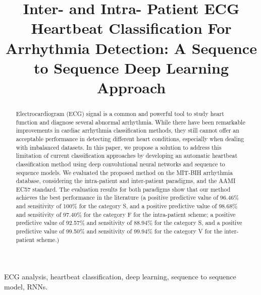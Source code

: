 \documentclass{article}
\title{Inter- and Intra- Patient ECG Heartbeat Classification For Arrhythmia Detection: A Sequence to Sequence Deep Learning Approach}
\begin{document}
\maketitle


\begin{abstract} 
Electrocardiogram (ECG) signal is a common and powerful tool to study heart function and diagnose several abnormal arrhythmia. While there have been remarkable improvements in cardiac arrhythmia classification methods,  they still cannot offer an acceptable performance in detecting different heart conditions, especially when dealing with imbalanced datasets. In this paper, we propose a solution to address this limitation of current classification approaches by developing an automatic heartbeat classification method using deep convolutional neural networks and sequence to sequence models. We evaluated the proposed method on the MIT-BIH arrhythmia database, considering the intra-patient and inter-patient paradigms, and the AAMI EC57 standard. The evaluation results for both paradigms show that our method achieves the best performance in the literature (a positive predictive value of 96.46\% and sensitivity of 100\% for the category S, and a positive predictive value of 98.68\% and sensitivity of 97.40\%  for the category F for the intra-patient scheme; a positive predictive value of 92.57\%  and sensitivity of 88.94\% for the  category S, and a positive predictive value of 99.50\% and sensitivity of 99.94\%  for the category V for the inter-patient scheme.)
\end{abstract}



\begin{keywords}
ECG analysis, heartbeat classification, deep learning, sequence to sequence model, RNNs. 
\end{keywords}
\end{document}
